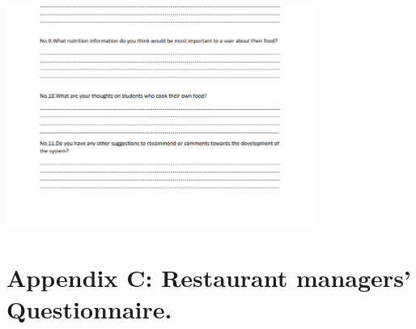 \documentclass{article}
\begin{document}
\begin{center}
    \includegraphics[width=380px]{images/doctors4.PNG}
\end{center}

\newpage
\appendix
\renewcommand{\thesection}{} %
\section{Appendix C: Restaurant managers' Questionnaire.}
\end{document}
